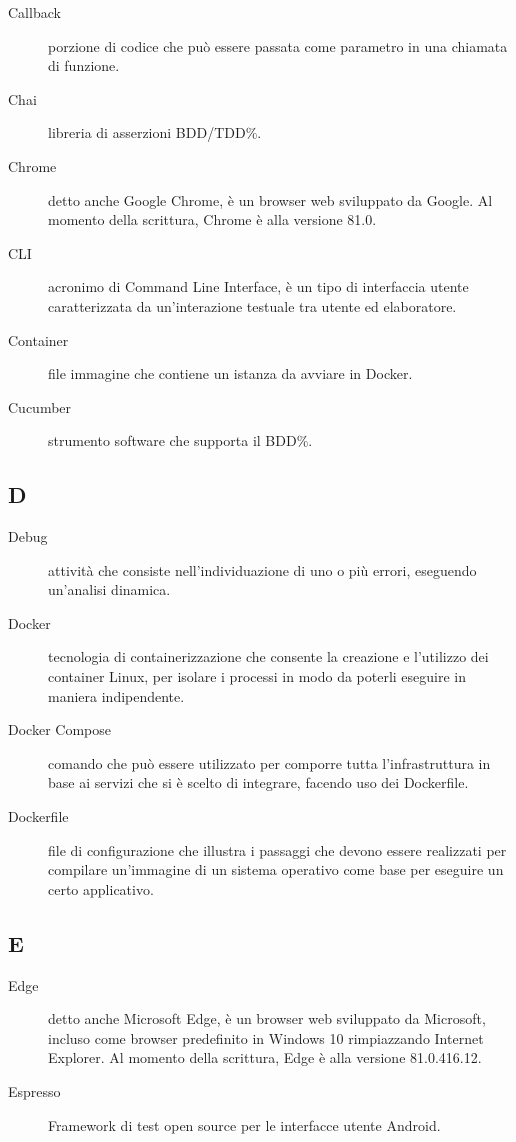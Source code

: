 \documentclass[../manuale-manutentore.tex]{subfiles}
\begin{document}
\begin{description}
    \item[Callback] porzione di codice che può essere passata come parametro in una chiamata di funzione.
    \item[Chai] libreria di asserzioni BDD/TDD\%.
    \item[Chrome] detto anche Google Chrome, è un browser web sviluppato da Google. Al momento della scrittura, Chrome è alla versione 81.0.
    \item[CLI] acronimo di Command Line Interface, è un tipo di interfaccia utente caratterizzata da un'interazione testuale tra utente ed elaboratore.
    \item[Container] file immagine che contiene un istanza da avviare in Docker.
    \item[Cucumber] strumento software che supporta il BDD\%.
\end{description}

\subsection{D}

\begin{description}
    \item[Debug] attività che consiste nell'individuazione di uno o più errori, eseguendo un'analisi dinamica.
    \item[Docker] tecnologia di containerizzazione che consente la creazione e l'utilizzo dei container Linux, per isolare i processi in modo da poterli eseguire in maniera indipendente.
    \item[Docker Compose] comando che può essere utilizzato per comporre tutta l'infrastruttura in base ai servizi che si è scelto di integrare, facendo uso dei Dockerfile.
    \item[Dockerfile] file di configurazione che illustra i passaggi che devono essere realizzati per compilare un'immagine di un sistema operativo come base per eseguire un certo applicativo.
\end{description}

\subsection{E}

\begin{description}
  \item[Edge] detto anche Microsoft Edge, è un browser web sviluppato da Microsoft, incluso come browser predefinito in Windows 10 rimpiazzando Internet Explorer. Al momento della scrittura, Edge è alla versione 81.0.416.12.
  \item[Espresso] Framework di test open source per le interfacce utente Android.
\end{description}
\end{document}
